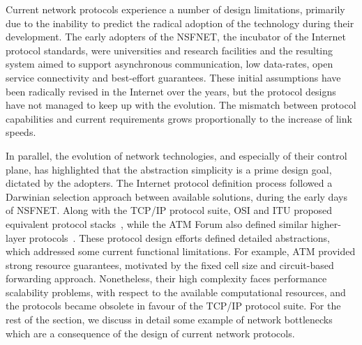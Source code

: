 Current network protocols experience a number of design limitations, primarily
due to the inability to predict the radical adoption of the technology during
their development.  The early adopters of the NSFNET, the incubator  of the
Internet protocol standards, were universities and research facilities and the
resulting system aimed to support asynchronous communication, low data-rates,
open service connectivity and best-effort guarantees. These initial assumptions
have been radically revised in the Internet over the years, but the protocol
designs have not managed to keep up with the evolution. The mismatch between
protocol capabilities and current requirements grows proportionally to the
increase of link speeds.

In parallel, the evolution of network technologies, and especially of their
control plane, has highlighted that the abstraction simplicity is a prime design
goal, dictated by the adopters. The Internet protocol definition process
followed a Darwinian selection approach between available solutions, during the
early days of NSFNET\@. Along with the TCP/IP protocol suite, OSI and ITU
proposed equivalent protocol stacks~, while the ATM Forum also
defined similar higher-layer protocols~. These protocol design
efforts defined detailed abstractions, which addressed some current functional
limitations.  For example, ATM provided strong resource guarantees, motivated by
the fixed cell size and circuit-based forwarding approach.  Nonetheless, their
high complexity faces performance scalability problems, with respect to the
available computational resources, and the protocols became obsolete in favour
of the TCP/IP protocol suite. For the rest of the section, we discuss in detail
some example of network bottlenecks which are a consequence of the design of
current network protocols.

